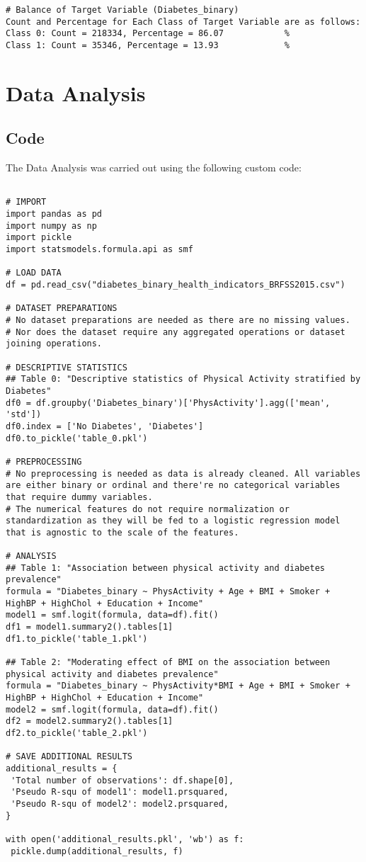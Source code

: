 \documentclass[11pt]{article}
\begin{document}
\begin{Verbatim}[tabsize=4]
# Balance of Target Variable (Diabetes_binary)
Count and Percentage for Each Class of Target Variable are as follows:
Class 0: Count = 218334, Percentage = 86.07            %
Class 1: Count = 35346, Percentage = 13.93             %

\end{Verbatim}

\section{Data Analysis} \subsection{Code}The Data Analysis was carried out using the following custom code:

\begin{verbatim}

# IMPORT
import pandas as pd
import numpy as np
import pickle
import statsmodels.formula.api as smf

# LOAD DATA
df = pd.read_csv("diabetes_binary_health_indicators_BRFSS2015.csv")

# DATASET PREPARATIONS
# No dataset preparations are needed as there are no missing values.
# Nor does the dataset require any aggregated operations or dataset joining operations.

# DESCRIPTIVE STATISTICS
## Table 0: "Descriptive statistics of Physical Activity stratified by Diabetes"
df0 = df.groupby('Diabetes_binary')['PhysActivity'].agg(['mean', 'std'])
df0.index = ['No Diabetes', 'Diabetes']
df0.to_pickle('table_0.pkl')

# PREPROCESSING
# No preprocessing is needed as data is already cleaned. All variables are either binary or ordinal and there're no categorical variables that require dummy variables.
# The numerical features do not require normalization or standardization as they will be fed to a logistic regression model that is agnostic to the scale of the features.

# ANALYSIS
## Table 1: "Association between physical activity and diabetes prevalence"
formula = "Diabetes_binary ~ PhysActivity + Age + BMI + Smoker + HighBP + HighChol + Education + Income"
model1 = smf.logit(formula, data=df).fit()
df1 = model1.summary2().tables[1]
df1.to_pickle('table_1.pkl')

## Table 2: "Moderating effect of BMI on the association between physical activity and diabetes prevalence"
formula = "Diabetes_binary ~ PhysActivity*BMI + Age + BMI + Smoker + HighBP + HighChol + Education + Income"
model2 = smf.logit(formula, data=df).fit()
df2 = model2.summary2().tables[1] 
df2.to_pickle('table_2.pkl')

# SAVE ADDITIONAL RESULTS
additional_results = {
 'Total number of observations': df.shape[0], 
 'Pseudo R-squ of model1': model1.prsquared,
 'Pseudo R-squ of model2': model2.prsquared,
}

with open('additional_results.pkl', 'wb') as f:
 pickle.dump(additional_results, f)

\end{verbatim}
\end{document}
